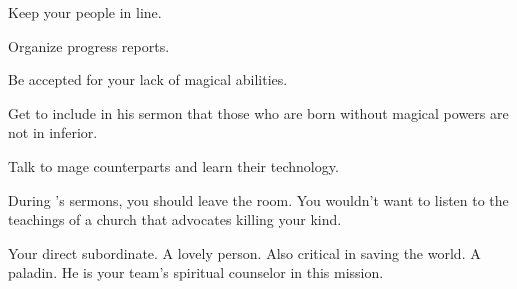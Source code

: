 \documentclass[char]{guildcamp3}
\begin{document}
\begin{itemz}[Goals]
  \item Keep your people in line.
  \item Organize progress reports.
  \item Be accepted for your lack of magical abilities.
  \item Get \cPaladin{} to include in his sermon that those who are born without magical powers are not in inferior.
  \item Talk to mage counterparts and learn their technology.
\end{itemz}

\begin{itemz}[Notes]
	\item During \cPaladin{\formal}'s sermons, you should leave the room. You wouldn't want to listen to the teachings of a church that advocates killing your kind. 
\end{itemz}


\begin{contacts}
  \contact{\cNobleTwo{}} Your direct subordinate. 
  \contact{\cMageOne{}} A lovely person. Also critical in saving the world.
  \contact{\cPaladin{}} A paladin. He is your team's spiritual counselor in this mission.
\end{contacts}
\end{document}
